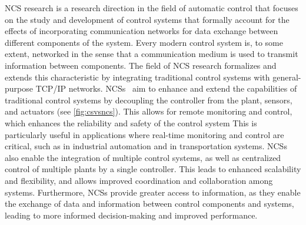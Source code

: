 \gls{NCS} research is a research direction in the field of automatic control that focuses on the study and development of control systems that formally account for the effects of incorporating communication networks for data exchange between different components of the system.
Every modern control system is, to some extent, networked in the sense that a communication medium is used to transmit information between components.
The field of \gls{NCS} research formalizes and extends this characteristic by integrating traditional control systems with general-purpose \acs{TCP}/\acs{IP} networks.
\glspl{NCS}~\cite{gupta2010networked} aim to enhance and extend the capabilities of traditional control systems by decoupling the controller from the plant, sensors, and actuators (see \cref{fig:csvsncs}).
This allows for remote monitoring and control, which enhances the reliability and safety of the control system
This is particularly useful in applications where real-time monitoring and control are critical, such as in industrial automation and in transportation systems.
\glspl{NCS} also enable the integration of multiple control systems, as well as centralized control of multiple plants by a single controller.
This leads to enhanced scalability and flexibility, and allows improved coordination and collaboration among systems.
Furthermore, \glspl{NCS} provide greater access to information, as they enable the exchange of data and information between control components and systems, leading to more informed decision-making and improved performance.

